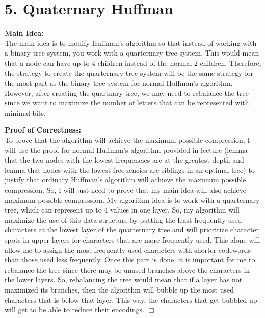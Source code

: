 \documentclass[11pt]{article}
\def\endproofmark{$\Box$}
\newenvironment{mainIdea}{\par{\bf Main Idea:}}{\smallskip}
\newenvironment{proofOfCorrectness}{\par{\bf Proof of Correctness:}}{\endproofmark\smallskip}
\begin{document}
\newpage
\section*{5. Quaternary Huffman}
\begin{mainIdea}
\\
The main idea is to modify Huffman's algorithm so that instead of working with a binary tree system, you work with a quarternary tree system. This would mean that a node can have up to $4$ children instead of the normal $2$ children. Therefore, the strategy to create the quarternary tree system will be the same strategy for the most part as the binary tree system for normal Huffman's algorithm. However, after creating the quartnary tree, we may need to rebalance the tree since we want to maximize the number of letters that can be represented with minimal bits.
\end{mainIdea}
\\
\begin{proofOfCorrectness}
\\
To prove that the algorithm will achieve the maximum possible compression, I will use the proof for normal Huffman's algorithm provided in lecture (lemma that the two nodes with the lowest frequencies are at the greatest depth and lemma that nodes with the lowest frequencies are siblings in an optimal tree) to justify that ordinary Huffman's algorithm will achieve the maximum possible compression. So, I will just need to prove that my main idea will also achieve maximum possible compression. My algorithm idea is to work with a quarternary tree, which can represent up to $4$ values in one layer. So, my algorithm will maximize the use of this data structure by putting the least frequently used characters at the lowest layer of the quarternary tree and will prioritize character spots in upper layers for characters that are more frequently used. This alone will allow me to assign the most frequently used characters with shorter codewords than those used less frequently. Once this part is done, it is important for me to rebalance the tree since there may be unused branches above the characters in the lower layers. So, rebalancing the tree would mean that if a layer has not maximized its branches, then the algorithm will bubble up the most used characters that is below that layer. This way, the characters that get bubbled up will get to be able to reduce their encodings. 
\end{proofOfCorrectness}
\end{document}

